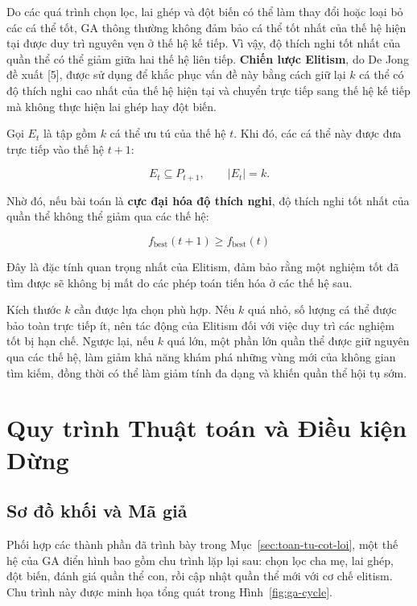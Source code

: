 Do các quá trình chọn lọc, lai ghép và đột biến có thể làm thay đổi hoặc loại bỏ
các cá thể tốt, GA thông thường không đảm bảo cá thể tốt nhất của thế hệ hiện
tại được duy trì nguyên vẹn ở thế hệ kế tiếp. Vì vậy, độ thích nghi tốt nhất của
quần thể có thể giảm giữa hai thế hệ liên tiếp. \textbf{Chiến lược Elitism}, do
De Jong đề xuất [5], được sử dụng để khắc phục vấn đề này bằng cách giữ lại $k$
cá thể có độ thích nghi cao nhất của thế hệ hiện tại và chuyển trực tiếp sang
thế hệ kế tiếp mà không thực hiện lai ghép hay đột biến.

Gọi $E_t$ là tập gồm $k$ cá thể ưu tú của thế hệ $t$. Khi đó, các cá thể này
được đưa trực tiếp vào thế hệ $t+1$:

\[
E_t \subseteq P_{t+1}, \qquad |E_t| = k.
\]

Nhờ đó, nếu bài toán là \textbf{cực đại hóa độ thích nghi}, độ thích nghi tốt
nhất của quần thể không thể giảm qua các thế hệ:

\[
\boxed{
f_{\mathrm{best}}(t+1) \geq f_{\mathrm{best}}(t)
}
\]

Đây là đặc tính quan trọng nhất của Elitism, đảm bảo rằng một nghiệm tốt đã
tìm được sẽ không bị mất do các phép toán tiến hóa ở các thế hệ sau.

Kích thước $k$ cần được lựa chọn phù hợp. Nếu $k$ quá nhỏ, số lượng cá thể
được bảo toàn trực tiếp ít, nên tác động của Elitism đối với việc duy trì các
nghiệm tốt bị hạn chế. Ngược lại, nếu $k$ quá lớn, một phần lớn quần thể được
giữ nguyên qua các thế hệ, làm giảm khả năng khám phá những vùng mới của
không gian tìm kiếm, đồng thời có thể làm giảm tính đa dạng và khiến quần thể
hội tụ sớm.


\section{Quy trình Thuật toán và Điều kiện Dừng}
\label{sec:quy-trinh}

\subsection*{Sơ đồ khối và Mã giả}
\label{subsec:so-do-gia-ma}

Phối hợp các thành phần đã trình bày trong
Mục~\ref{sec:toan-tu-cot-loi}, một thế hệ của GA điển hình bao gồm
chu trình lặp lại sau: chọn lọc cha mẹ, lai ghép, đột biến, đánh giá
quần thể con, rồi cập nhật quần thể mới với cơ chế elitism. Chu trình
này được minh họa tổng quát trong Hình~\ref{fig:ga-cycle}.

